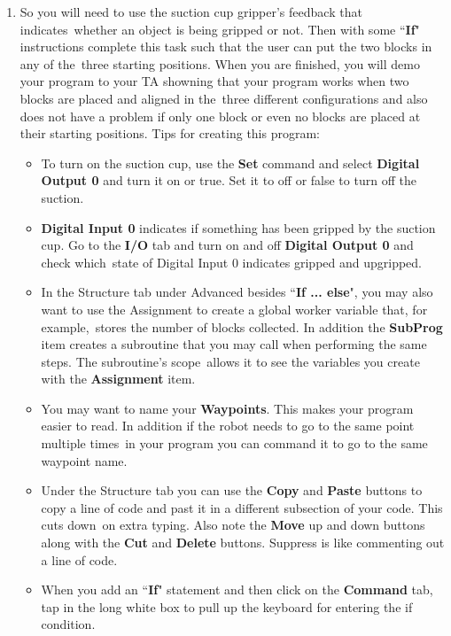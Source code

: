 \begin{enumerate}
\item So you will need to use the suction cup gripper's feedback that indicates\ 
whether an object is being gripped or not.  Then with some ``\textbf{If}" instructions complete this task such that the user can put the two blocks in any of the\
three starting positions.  When you are finished, you will demo your program to your TA showning that your program works when two blocks are placed and aligned in the\
three different configurations and also does not have a problem if only one block or even no blocks are placed at their starting positions.  
Tips for creating this program:
\begin{itemize}
\item To turn on the suction cup, use the \textbf{Set} command and select \textbf{Digital Output 0} and turn it on or true.  Set it to off or false to turn off the suction.  
\item \textbf{Digital Input 0} indicates if something has been gripped by the suction cup.  Go to the \textbf{I/O} tab and turn on and off \textbf{Digital Output 0} and check which\
state of Digital Input 0 indicates gripped and upgripped.  
\item In the Structure tab under Advanced besides ``\textbf{If ... else}", you may also want to use the Assignment to create a global worker variable that, for example,\
stores the number of blocks collected.  In addition the \textbf{SubProg} item creates a subroutine that you may call when performing the same steps.  The subroutine's scope\
allows it to see the variables you create with the \textbf{Assignment} item.  
\item You may want to name your \textbf{Waypoints}.  This makes your program easier to read.  In addition if the robot needs to go to the same point multiple times\
in your program you can command it to go to the same waypoint name.  
\item Under the Structure tab you can use the \textbf{Copy} and \textbf{Paste} buttons to copy a line of code and past it in a different subsection of your code.  This cuts down\
on extra typing.  Also note the \textbf{Move} up and down buttons along with the \textbf{Cut} and \textbf{Delete} buttons.  Suppress is like commenting out a line of code.  
\item When you add an ``\textbf{If}" statement and then click on the \textbf{Command} tab, tap in the long white box to pull up the keyboard for entering the if condition.    
\end{itemize} 


\end{enumerate}
